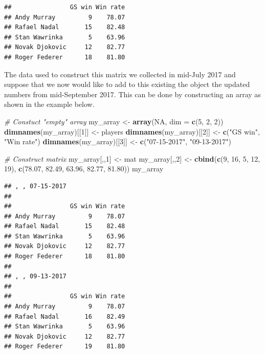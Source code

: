 \documentclass[12pt,]{krantz}
\newenvironment{Shaded}{\begin{snugshade}}{\end{snugshade}}
\newcommand{\KeywordTok}[1]{\textcolor[rgb]{0.27,0.27,0.27}{\textbf{#1}}}
\newcommand{\DataTypeTok}[1]{\textcolor[rgb]{0.27,0.27,0.27}{#1}}
\newcommand{\DecValTok}[1]{\textcolor[rgb]{0.06,0.06,0.06}{#1}}
\newcommand{\FloatTok}[1]{\textcolor[rgb]{0.06,0.06,0.06}{#1}}
\newcommand{\StringTok}[1]{\textcolor[rgb]{0.5,0.5,0.5}{#1}}
\newcommand{\CommentTok}[1]{\textcolor[rgb]{0.37,0.37,0.37}{\textit{#1}}}
\newcommand{\OtherTok}[1]{\textcolor[rgb]{0.37,0.37,0.37}{#1}}
\newcommand{\NormalTok}[1]{#1}
\begin{document}
\begin{verbatim}
##                GS win Win rate
## Andy Murray         9    78.07
## Rafael Nadal       15    82.48
## Stan Wawrinka       5    63.96
## Novak Djokovic     12    82.77
## Roger Federer      18    81.80
\end{verbatim}

The data used to construct this matrix we collected in mid-July 2017 and
suppose that we now would like to add to this existing the object the
updated numbers from mid-September 2017. This can be done by
constructing an array as shown in the example below.

\begin{Shaded}
\begin{Highlighting}[]
\CommentTok{# Constuct "empty" array}
\NormalTok{my_array <-}\StringTok{ }\KeywordTok{array}\NormalTok{(}\OtherTok{NA}\NormalTok{, }\DataTypeTok{dim =} \KeywordTok{c}\NormalTok{(}\DecValTok{5}\NormalTok{, }\DecValTok{2}\NormalTok{, }\DecValTok{2}\NormalTok{))}
\KeywordTok{dimnames}\NormalTok{(my_array)[[}\DecValTok{1}\NormalTok{]] <-}\StringTok{ }\NormalTok{players}
\KeywordTok{dimnames}\NormalTok{(my_array)[[}\DecValTok{2}\NormalTok{]] <-}\StringTok{ }\KeywordTok{c}\NormalTok{(}\StringTok{"GS win"}\NormalTok{, }\StringTok{"Win rate"}\NormalTok{)}
\KeywordTok{dimnames}\NormalTok{(my_array)[[}\DecValTok{3}\NormalTok{]] <-}\StringTok{ }\KeywordTok{c}\NormalTok{(}\StringTok{"07-15-2017"}\NormalTok{, }\StringTok{"09-13-2017"}\NormalTok{)}

\CommentTok{# Construct matrix}
\NormalTok{my_array[,,}\DecValTok{1}\NormalTok{] <-}\StringTok{ }\NormalTok{mat}
\NormalTok{my_array[,,}\DecValTok{2}\NormalTok{] <-}\StringTok{ }\KeywordTok{cbind}\NormalTok{(}\KeywordTok{c}\NormalTok{(}\DecValTok{9}\NormalTok{, }\DecValTok{16}\NormalTok{, }\DecValTok{5}\NormalTok{, }\DecValTok{12}\NormalTok{, }\DecValTok{19}\NormalTok{), }
                       \KeywordTok{c}\NormalTok{(}\FloatTok{78.07}\NormalTok{, }\FloatTok{82.49}\NormalTok{, }\FloatTok{63.96}\NormalTok{, }\FloatTok{82.77}\NormalTok{, }\FloatTok{81.80}\NormalTok{))}
\NormalTok{my_array}
\end{Highlighting}
\end{Shaded}

\begin{verbatim}
## , , 07-15-2017
## 
##                GS win Win rate
## Andy Murray         9    78.07
## Rafael Nadal       15    82.48
## Stan Wawrinka       5    63.96
## Novak Djokovic     12    82.77
## Roger Federer      18    81.80
## 
## , , 09-13-2017
## 
##                GS win Win rate
## Andy Murray         9    78.07
## Rafael Nadal       16    82.49
## Stan Wawrinka       5    63.96
## Novak Djokovic     12    82.77
## Roger Federer      19    81.80
\end{verbatim}
\end{document}
